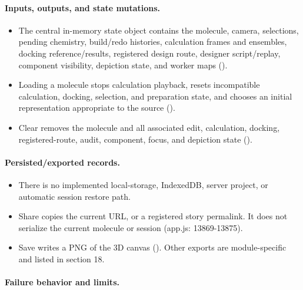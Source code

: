 \documentclass[11pt]{article}
\begin{document}
\begin{small}
\begin{itemize}[leftmargin=*]
\end{itemize}

\paragraph{Inputs, outputs, and state mutations.}

\begin{itemize}[leftmargin=*]

\item The central in-memory state object contains the molecule, camera, selections, pending chemistry, build/redo histories, calculation frames and ensembles, docking reference/results, registered design route, designer script/replay, component visibility, depiction state, and worker maps ().

\item Loading a molecule stops calculation playback, resets incompatible calculation, docking, selection, and preparation state, and chooses an initial representation appropriate to the source ().

\item Clear removes the molecule and all associated edit, calculation, docking, registered-route, audit, component, focus, and depiction state ().

\end{itemize}

\paragraph{Persisted/exported records.}

\begin{itemize}[leftmargin=*]

\item There is no implemented local-storage, IndexedDB, server project, or automatic session restore path.

\item Share copies the current URL, or a registered story permalink. It does not serialize the current molecule or session (app.js: 13869-13875).

\item Save writes a PNG of the 3D canvas (). Other exports are module-specific and listed in section 18.

\end{itemize}

\paragraph{Failure behavior and limits.}


\end{small}
\end{document}
